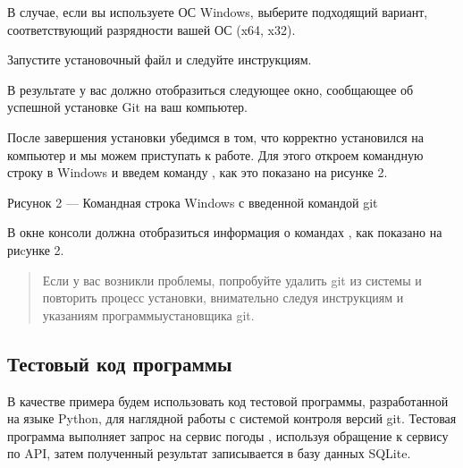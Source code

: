 \documentclass[letterpaper,10pt,russian]{sphinxmanual}
\begin{document}
\sphinxAtStartPar
{}

\sphinxAtStartPar
В случае, если вы используете ОС Windows, выберите подходящий вариант, соответствующий разрядности вашей ОС (x64, x32).

\sphinxAtStartPar
{}

\sphinxAtStartPar
Запустите установочный файл и следуйте инструкциям.

\sphinxAtStartPar
{}

\sphinxAtStartPar
{}

\sphinxAtStartPar
В результате у вас должно отобразиться следующее окно, сообщающее об успешной установке Git на ваш компьютер.

\sphinxAtStartPar
{}

\sphinxAtStartPar
После завершения установки убедимся в том, что  корректно установился на компьютер и мы можем приступать к работе. Для этого откроем командную строку в Windows и введем команду , как это показано на рисунке 2.

\sphinxAtStartPar
{}

\sphinxAtStartPar
Рисунок 2 — Командная строка Windows с введенной командой git

\sphinxAtStartPar
В окне консоли должна отобразиться информация о командах , как показано на риcунке 2.
\begin{quote}

\sphinxAtStartPar
Если у вас возникли проблемы, попробуйте удалить git из системы и повторить процесс установки, внимательно следуя инструкциям и указаниям программы\sphinxhyphen{}установщика git.
\end{quote}


\subsection{Тестовый код программы}
\label{\detokenize{educational_materials/git_base/content:id4}}
\sphinxAtStartPar
В качестве примера будем использовать код тестовой программы, разработанной на языке Python, для наглядной работы с системой контроля версий git. Тестовая программа выполняет запрос на сервис погоды , используя обращение к сервису по API, затем полученный результат записывается в базу данных SQLite.
\end{document}
